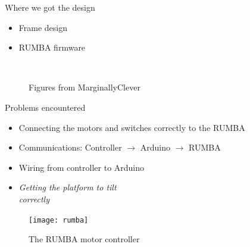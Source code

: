 \documentclass{rubeamer}
\begin{document}
\begin{frame}{Where we got the design}
	\begin{itemize}
		\vspace{1em}
		\item Frame design~\cite{sp}
		\item RUMBA firmware~\cite{sp_code}
	\end{itemize}
	
	\begin{figure}
		~
		\caption*{Figures from MarginallyClever~\cite{sp}}
	\end{figure}	
\end{frame}

\begin{frame}{Problems encountered}
	\vspace{3em}
	\begin{itemize}
		\item Connecting the motors and switches correctly to the RUMBA
		\item Communications: Controller $\rightarrow$ Arduino $\rightarrow$ RUMBA
		\item Wiring from controller to Arduino
		\item \textit{Getting the platform to tilt\\correctly}
	\end{itemize}
	
	\begin{figure}
		\vspace{-3em}
		\raggedleft
		\texttt{[image: rumba]}
		\caption*{\hspace{20em}The RUMBA motor controller}
	\end{figure}
\end{frame}
\end{document}
